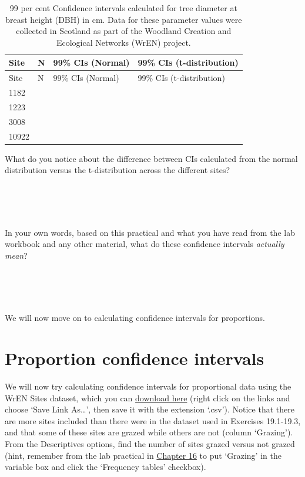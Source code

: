 \documentclass[
]{scrbook}
\begin{document}
\begin{longtable}[]{@{}llll@{}}
\caption{99 per cent Confidence intervals calculated for tree diameter at breast height (DBH) in cm. Data for these parameter values were collected in Scotland as part of the Woodland Creation and Ecological Networks (WrEN) project.}\tabularnewline
\toprule
Site & N & 99\% CIs (Normal) & 99\% CIs (t-distribution) \\
\midrule
\endfirsthead
\toprule
Site & N & 99\% CIs (Normal) & 99\% CIs (t-distribution) \\
\midrule
\endhead
1182 & & & \\
1223 & & & \\
3008 & & & \\
10922 & & & \\
\bottomrule
\end{longtable}

What do you notice about the difference between CIs calculated from the normal distribution versus the t-distribution across the different sites?

\begin{verbatim}




\end{verbatim}

In your own words, based on this practical and what you have read from the lab workbook and any other material, what do these confidence intervals \emph{actually mean}?

\begin{verbatim}




\end{verbatim}

We will now move on to calculating confidence intervals for proportions.

\hypertarget{proportion-confidence-intervals}{%
\section{Proportion confidence intervals}\label{proportion-confidence-intervals}}

We will now try calculating confidence intervals for proportional data using the WrEN Sites dataset, which you can \href{https://raw.githubusercontent.com/bradduthie/SCIU4T4/main/data/wren_sites.csv}{download here} (right click on the links and choose `Save Link As\ldots{}', then save it with the extension `.csv').
Notice that there are more sites included than there were in the dataset used in Exercises 19.1-19.3, and that some of these sites are grazed while others are not (column `Grazing').
From the Descriptives options, find the number of sites grazed versus not grazed (hint, remember from the lab practical in \protect\hyperlink{Chapter_16}{Chapter 16} to put `Grazing' in the variable box and click the `Frequency tables' checkbox).
\end{document}

